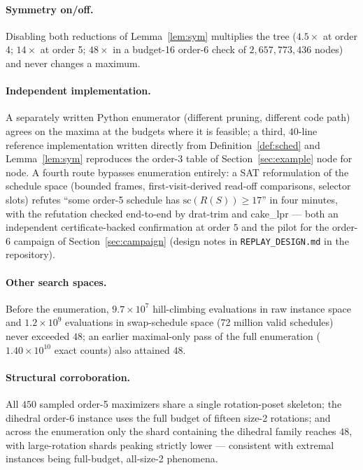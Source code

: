 \documentclass[11pt]{article}
\begin{document}
\paragraph{Symmetry on/off.} Disabling both reductions of Lemma~\ref{lem:sym} multiplies the tree
($4.5\times$ at order 4; $14\times$ at order 5; $48\times$ in a budget-16 order-6 check of
$2{,}657{,}773{,}436$ nodes) and never changes a maximum.

\paragraph{Independent implementation.} A separately written Python enumerator (different pruning,
different code path) agrees on the maxima at the budgets where it is feasible; a third,
$40$-line reference implementation written directly from
Definition~\ref{def:sched} and Lemma~\ref{lem:sym} reproduces the order-3 table of
Section~\ref{sec:example} node for node. A fourth route bypasses enumeration entirely: a
SAT reformulation of the schedule space (bounded frames, first-visit-derived read-off
comparisons, selector slots) refutes ``some order-5 schedule has $\mathrm{sc}(R(S))\ge
17$'' in four minutes, with the refutation checked end-to-end by \textsf{drat-trim} and
\textsf{cake\_lpr} --- both an independent certificate-backed confirmation at order $5$
and the pilot for the order-6 campaign of Section~\ref{sec:campaign} (design notes in
\texttt{REPLAY\_DESIGN.md} in the repository).

\paragraph{Other search spaces.} Before the enumeration, $9.7\times10^7$ hill-climbing
evaluations in raw instance space and $1.2\times10^9$ evaluations in swap-schedule space (72
million valid schedules) never exceeded $48$; an earlier maximal-only pass of the full enumeration
($1.40\times10^{10}$ exact counts) also attained $48$.

\paragraph{Structural corroboration.} All $450$ sampled order-5 maximizers share a single
rotation-poset skeleton; the dihedral order-6 instance uses the full budget of fifteen size-2
rotations; and across the enumeration only the shard containing the dihedral family reaches $48$,
with large-rotation shards peaking strictly lower --- consistent with extremal instances being
full-budget, all-size-2 phenomena.
\end{document}
